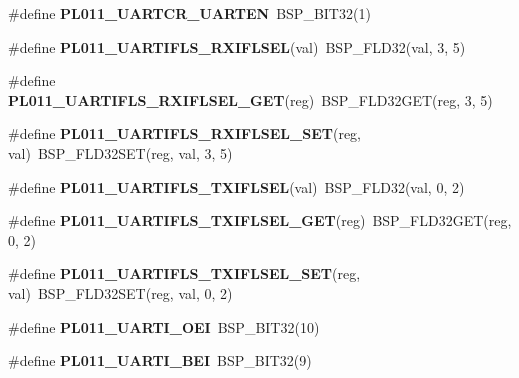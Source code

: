 \begin{DoxyCompactItemize}
\#define {\bfseries P\+L011\+\_\+\+U\+A\+R\+T\+C\+R\+\_\+\+U\+A\+R\+T\+EN}~B\+S\+P\+\_\+\+B\+I\+T32(1)
\item 
\mbox{\label{arm-pl011-regs_8h_a1d144732acfc78743fdb27088ce0d815}} 
\#define {\bfseries P\+L011\+\_\+\+U\+A\+R\+T\+I\+F\+L\+S\+\_\+\+R\+X\+I\+F\+L\+S\+EL}(val)~B\+S\+P\+\_\+\+F\+L\+D32(val, 3, 5)
\item 
\mbox{\label{arm-pl011-regs_8h_a4bf92f4913048b8936af26c1aaa78d9f}} 
\#define {\bfseries P\+L011\+\_\+\+U\+A\+R\+T\+I\+F\+L\+S\+\_\+\+R\+X\+I\+F\+L\+S\+E\+L\+\_\+\+G\+ET}(reg)~B\+S\+P\+\_\+\+F\+L\+D32\+G\+ET(reg, 3, 5)
\item 
\mbox{\label{arm-pl011-regs_8h_a5b901712f02488fd9ac02d26bdef2879}} 
\#define {\bfseries P\+L011\+\_\+\+U\+A\+R\+T\+I\+F\+L\+S\+\_\+\+R\+X\+I\+F\+L\+S\+E\+L\+\_\+\+S\+ET}(reg,  val)~B\+S\+P\+\_\+\+F\+L\+D32\+S\+ET(reg, val, 3, 5)
\item 
\mbox{\label{arm-pl011-regs_8h_a7e56b8593ae5d277ebb051e1cfebde7d}} 
\#define {\bfseries P\+L011\+\_\+\+U\+A\+R\+T\+I\+F\+L\+S\+\_\+\+T\+X\+I\+F\+L\+S\+EL}(val)~B\+S\+P\+\_\+\+F\+L\+D32(val, 0, 2)
\item 
\mbox{\label{arm-pl011-regs_8h_af7adbbc45d5f5392950fe86dbacd830c}} 
\#define {\bfseries P\+L011\+\_\+\+U\+A\+R\+T\+I\+F\+L\+S\+\_\+\+T\+X\+I\+F\+L\+S\+E\+L\+\_\+\+G\+ET}(reg)~B\+S\+P\+\_\+\+F\+L\+D32\+G\+ET(reg, 0, 2)
\item 
\mbox{\label{arm-pl011-regs_8h_a6f97dca65542b7bbda9a2fe7b3999603}} 
\#define {\bfseries P\+L011\+\_\+\+U\+A\+R\+T\+I\+F\+L\+S\+\_\+\+T\+X\+I\+F\+L\+S\+E\+L\+\_\+\+S\+ET}(reg,  val)~B\+S\+P\+\_\+\+F\+L\+D32\+S\+ET(reg, val, 0, 2)
\item 
\mbox{\label{arm-pl011-regs_8h_a2a938f651151372bd4c5fca5a1b32d48}} 
\#define {\bfseries P\+L011\+\_\+\+U\+A\+R\+T\+I\+\_\+\+O\+EI}~B\+S\+P\+\_\+\+B\+I\+T32(10)
\item 
\mbox{\label{arm-pl011-regs_8h_a25406f6c226ac1075a2eb73e84d578fd}} 
\#define {\bfseries P\+L011\+\_\+\+U\+A\+R\+T\+I\+\_\+\+B\+EI}~B\+S\+P\+\_\+\+B\+I\+T32(9)

\end{DoxyCompactItemize}
